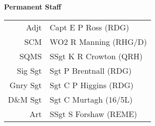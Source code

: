 \vspace*{10mm}

\begin{center}
  \Large
  \textbf{Permanent Staff}
\end{center}

\begin{center}
  \begin{tabular}{rl}
    Adjt & Capt E P Ross (RDG) \\
    SCM & WO2 R Manning (RHG/D) \\
    SQMS & SSgt K R Crowton (QRH) \\
    Sig Sgt & Sgt P Brentnall (RDG) \\
    Gnry Sgt & Sgt C P Higgins (RDG) \\
    D\&M Sgt & Sgt C Murtagh (16/5L) \\
    Art & SSgt S Forshaw (REME) \\
  \end{tabular}
\end{center}
